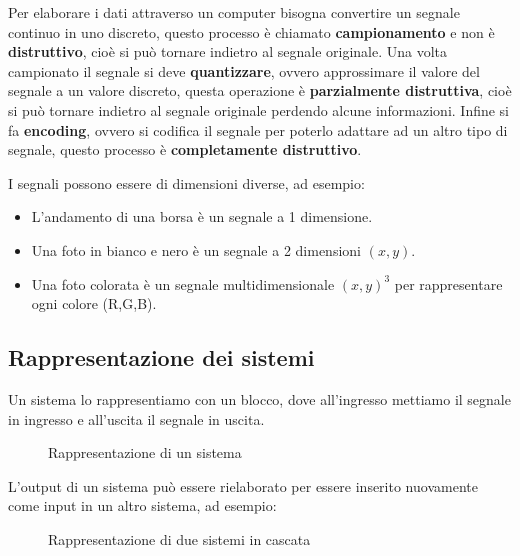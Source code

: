 \documentclass[a4paper]{article}
\theoremstyle{break}
\theoremstyle{break}
\theoremstyle{break}
\theoremstyle{break}
\begin{document}
\noindent
Per elaborare i dati attraverso un computer bisogna convertire un segnale continuo
in uno discreto, questo processo è chiamato \textbf{campionamento} e non è
\textbf{distruttivo}, cioè si può tornare indietro al segnale originale.
Una volta campionato il segnale si deve \textbf{quantizzare}, ovvero approssimare
il valore del segnale a un valore discreto, questa operazione è \textbf{parzialmente
distruttiva}, cioè si può tornare indietro al segnale originale perdendo alcune
informazioni. Infine si fa \textbf{encoding}, ovvero
si codifica il segnale per poterlo adattare ad un altro tipo di segnale, questo
processo è \textbf{completamente distruttivo}.

\noindent
I segnali possono essere di dimensioni diverse, ad esempio:
\begin{itemize}
  \item L'andamento di una borsa è un segnale a 1 dimensione.
  \item Una foto in bianco e nero è un segnale a 2 dimensioni \( (x,y) \).
  \item Una foto colorata è un segnale multidimensionale \( (x,y)^3 \) per
    rappresentare ogni colore (R,G,B).
\end{itemize}

\subsection{Rappresentazione dei sistemi}
Un sistema lo rappresentiamo con un blocco, dove all'ingresso mettiamo il segnale
in ingresso e all'uscita il segnale in uscita.
\begin{figure}[H]
  \centering
  \caption{Rappresentazione di un sistema}
\end{figure}

\noindent
L'output di un sistema può essere rielaborato per essere inserito nuovamente come
input in un altro sistema, ad esempio:

\begin{figure}[H]
  \centering
  \caption{Rappresentazione di due sistemi in cascata}
\end{figure}
\end{document}
